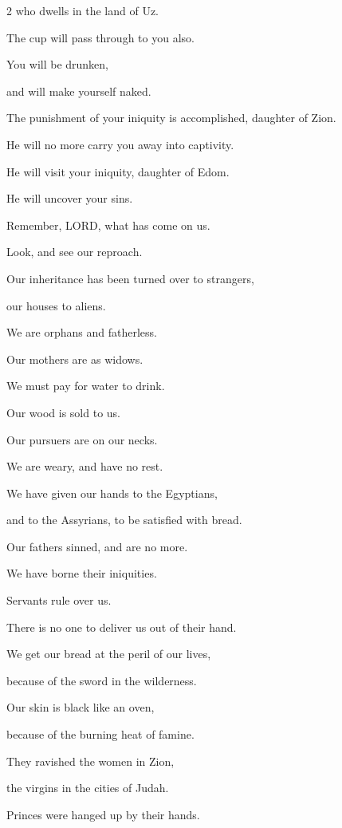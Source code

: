\begin{multicols}{2}
	who dwells in the land of Uz.
	
	The cup will pass through to you also.
	
	You will be drunken,
	
	and will make yourself naked.
	\vspace{\baselineskip}
	
	\myverse{}The punishment of your iniquity is accomplished, daughter of
	Zion.
	
	He will no more carry you away into captivity.
	
	He will visit your iniquity, daughter of Edom.
	
	He will uncover your sins.
	
	\mychapter{} \myverse*{}Remember, LORD, what has come on us.
	
	Look, and see our reproach.
	
	\myverse{}Our inheritance has been turned over to strangers,
	
	our houses to aliens.
	
	\myverse{}We are orphans and fatherless.
	
	Our mothers are as widows.
	
	\myverse{}We must pay for water to drink.
	
	Our wood is sold to us.
	
	\myverse{}Our pursuers are on our necks.
	
	We are weary, and have no rest.
	
	\myverse{}We have given our hands to the Egyptians,
	
	and to the Assyrians, to be satisfied with bread.
	
	
	\myverse{}Our fathers sinned, and are no more.
	
	We have borne their iniquities.
	
	
	\myverse{}Servants rule over us.
	
	There is no one to deliver us out of their hand.
	
	
	\myverse{}We get our bread at the peril of our lives,
	
	because of the sword in the wilderness.
	
	
	\myverse{}Our skin is black like an oven,
	
	because of the burning heat of famine.
	
	
	\myverse{}They ravished the women in Zion,
	
	the virgins in the cities of Judah.
	
	
	\myverse{}Princes were hanged up by their hands.
	

\end{multicols}
